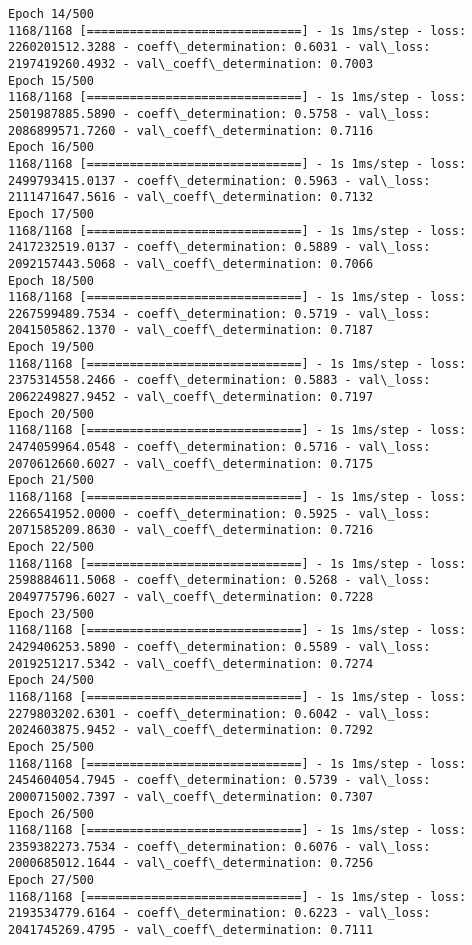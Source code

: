 \documentclass[11pt]{article}
\begin{document}
\begin{Verbatim}[commandchars=\\\{\}]
Epoch 14/500
1168/1168 [==============================] - 1s 1ms/step - loss: 2260201512.3288 - coeff\_determination: 0.6031 - val\_loss: 2197419260.4932 - val\_coeff\_determination: 0.7003
Epoch 15/500
1168/1168 [==============================] - 1s 1ms/step - loss: 2501987885.5890 - coeff\_determination: 0.5758 - val\_loss: 2086899571.7260 - val\_coeff\_determination: 0.7116
Epoch 16/500
1168/1168 [==============================] - 1s 1ms/step - loss: 2499793415.0137 - coeff\_determination: 0.5963 - val\_loss: 2111471647.5616 - val\_coeff\_determination: 0.7132
Epoch 17/500
1168/1168 [==============================] - 1s 1ms/step - loss: 2417232519.0137 - coeff\_determination: 0.5889 - val\_loss: 2092157443.5068 - val\_coeff\_determination: 0.7066
Epoch 18/500
1168/1168 [==============================] - 1s 1ms/step - loss: 2267599489.7534 - coeff\_determination: 0.5719 - val\_loss: 2041505862.1370 - val\_coeff\_determination: 0.7187
Epoch 19/500
1168/1168 [==============================] - 1s 1ms/step - loss: 2375314558.2466 - coeff\_determination: 0.5883 - val\_loss: 2062249827.9452 - val\_coeff\_determination: 0.7197
Epoch 20/500
1168/1168 [==============================] - 1s 1ms/step - loss: 2474059964.0548 - coeff\_determination: 0.5716 - val\_loss: 2070612660.6027 - val\_coeff\_determination: 0.7175
Epoch 21/500
1168/1168 [==============================] - 1s 1ms/step - loss: 2266541952.0000 - coeff\_determination: 0.5925 - val\_loss: 2071585209.8630 - val\_coeff\_determination: 0.7216
Epoch 22/500
1168/1168 [==============================] - 1s 1ms/step - loss: 2598884611.5068 - coeff\_determination: 0.5268 - val\_loss: 2049775796.6027 - val\_coeff\_determination: 0.7228
Epoch 23/500
1168/1168 [==============================] - 1s 1ms/step - loss: 2429406253.5890 - coeff\_determination: 0.5589 - val\_loss: 2019251217.5342 - val\_coeff\_determination: 0.7274
Epoch 24/500
1168/1168 [==============================] - 1s 1ms/step - loss: 2279803202.6301 - coeff\_determination: 0.6042 - val\_loss: 2024603875.9452 - val\_coeff\_determination: 0.7292
Epoch 25/500
1168/1168 [==============================] - 1s 1ms/step - loss: 2454604054.7945 - coeff\_determination: 0.5739 - val\_loss: 2000715002.7397 - val\_coeff\_determination: 0.7307
Epoch 26/500
1168/1168 [==============================] - 1s 1ms/step - loss: 2359382273.7534 - coeff\_determination: 0.6076 - val\_loss: 2000685012.1644 - val\_coeff\_determination: 0.7256
Epoch 27/500
1168/1168 [==============================] - 1s 1ms/step - loss: 2193534779.6164 - coeff\_determination: 0.6223 - val\_loss: 2041745269.4795 - val\_coeff\_determination: 0.7111

\end{Verbatim}
\end{document}

